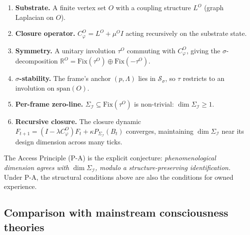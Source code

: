 \documentclass[11pt]{article}
\theoremstyle{plain}
\theoremstyle{definition}
\theoremstyle{remark}
\newcommand{\Fix}{\mathrm{Fix}}
\newcommand{\Ical}{\mathcal{I}}
\newcommand{\Cph}{C_\varphi}
\begin{document}
\begin{enumerate}[leftmargin=2em]
\item \textbf{Substrate.} A finite vertex set $O$ with a coupling structure $L^O$ (graph Laplacian on $O$).
\item \textbf{Closure operator.} $\Cph^O = L^O + \mu^O I$ acting recursively on the substrate state.
\item \textbf{Symmetry.} A unitary involution $\tau^O$ commuting with $\Cph^O$, giving the $\sigma$-decomposition $\mathbb{R}^O = \Fix(\tau^O) \oplus \Fix(-\tau^O)$.
\item \textbf{$\sigma$-stability.} The frame's anchor $(p, \Lambda)$ lies in $\mathcal{S}_\sigma$, so $\tau$ restricts to an involution on $\mathrm{span}(O)$.
\item \textbf{Per-frame zero-line.} $\Sigma_\Ical \subseteq \Fix(\tau^O)$ is non-trivial: $\dim \Sigma_\Ical \geq 1$.
\item \textbf{Recursive closure.} The closure dynamic $F_{t+1} = (I - \lambda \Cph^O) F_t + \kappa P_{\Sigma_\Ical}(B_t)$ converges, maintaining $\dim \Sigma_\Ical$ near its design dimension across many ticks.
\end{enumerate}

The Access Principle (P-A) is the explicit conjecture: \emph{phenomenological dimension agrees with $\dim \Sigma_\Ical$, modulo a structure-preserving identification.} Under P-A, the structural conditions above are also the conditions for owned experience.

\subsection{Comparison with mainstream consciousness theories}
\end{document}
